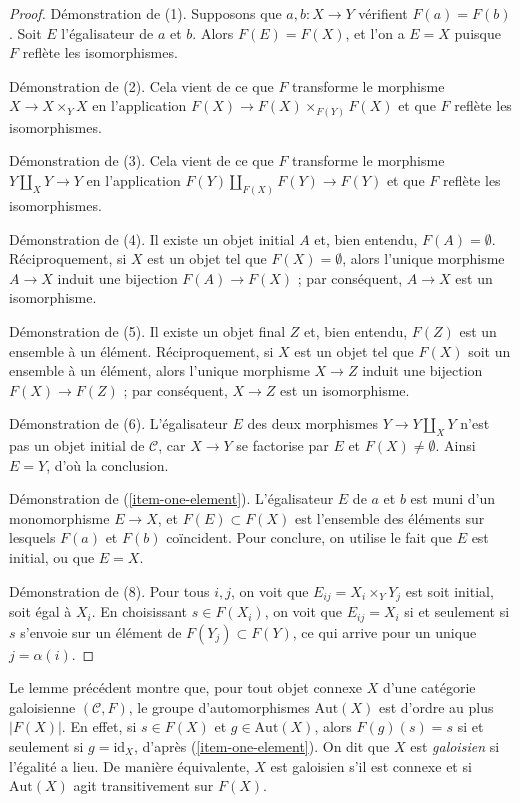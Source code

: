 \begin{proof}
Démonstration de (1). Supposons que $a, b : X \to Y$ vérifient $F(a) = F(b)$.
Soit $E$ l'égalisateur de $a$ et $b$. Alors $F(E) = F(X)$,
et l'on a $E = X$ puisque $F$ reflète les isomorphismes.

\medskip\noindent
Démonstration de (2). Cela vient de ce que $F$ transforme le morphisme $X \to X \times_Y X$
en l'application $F(X) \to F(X) \times_{F(Y)} F(X)$ et que $F$ reflète les isomorphismes.

\medskip\noindent
Démonstration de (3). Cela vient de ce que $F$ transforme le morphisme $Y \amalg_X Y \to Y$
en l'application $F(Y) \amalg_{F(X)} F(Y) \to F(Y)$ et que $F$ reflète les isomorphismes.

\medskip\noindent
Démonstration de (4). Il existe un objet initial $A$ et, bien entendu,
$F(A) = \emptyset$. Réciproquement, si $X$ est un objet tel que
$F(X) = \emptyset$, alors l'unique morphisme $A \to X$ induit une bijection
$F(A) \to F(X)$ ; par conséquent, $A \to X$ est un isomorphisme.

\medskip\noindent
Démonstration de (5). Il existe un objet final $Z$ et, bien entendu,
$F(Z)$ est un ensemble à un élément. Réciproquement, si $X$ est un objet tel que
$F(X)$ soit un ensemble à un élément, alors l'unique morphisme $X \to Z$ induit une bijection
$F(X) \to F(Z)$ ; par conséquent, $X \to Z$ est un isomorphisme.

\medskip\noindent
Démonstration de (6). L'égalisateur $E$ des deux morphismes $Y \to Y \amalg_X Y$ n'est pas
un objet initial de $\mathcal{C}$, car $X \to Y$ se factorise par $E$
et $F(X) \not = \emptyset$. Ainsi $E = Y$, d'où la conclusion.

\medskip\noindent
Démonstration de (\ref{item-one-element}).
L'égalisateur $E$ de $a$ et $b$ est muni d'un monomorphisme
$E \to X$, et $F(E) \subset F(X)$ est l'ensemble des éléments sur lesquels
$F(a)$ et $F(b)$ coïncident. Pour conclure, on utilise le fait que $E$ est initial,
ou que $E = X$.

\medskip\noindent
Démonstration de (8). Pour tous $i, j$, on voit que $E_{ij} = X_i \times_Y Y_j$
est soit initial, soit égal à $X_i$. En choisissant $s \in F(X_i)$,
on voit que $E_{ij} = X_i$ si et seulement si $s$ s'envoie sur un élément
de $F(Y_j) \subset F(Y)$, ce qui arrive pour un unique $j = \alpha(i)$.
\end{proof}

\noindent
Le lemme précédent montre que, pour tout objet connexe $X$ d'une
catégorie galoisienne $(\mathcal{C}, F)$, le groupe d'automorphismes
$\text{Aut}(X)$ est d'ordre au plus $|F(X)|$. En effet, si $s \in F(X)$
et $g \in \text{Aut}(X)$, alors $F(g)(s) = s$ si et seulement
si $g = \text{id}_X$, d'après (\ref{item-one-element}).
On dit que $X$ est {\it galoisien} si l'égalité a lieu.
De manière équivalente, $X$ est galoisien s'il est connexe et si
$\text{Aut}(X)$ agit transitivement sur $F(X)$.

